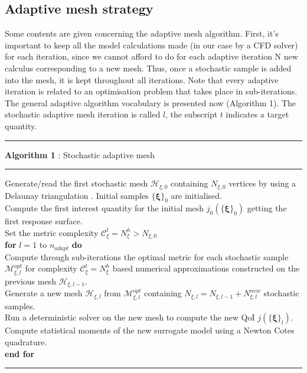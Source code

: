 \documentclass[11pt, a4paper, English]{report}
\begin{document}
\begin{appendix}
\subsection{Adaptive mesh strategy}
Some contents are given concerning the adaptive mesh algorithm. First, it's important to keep all the model calculations made (in our case by a CFD solver) for each iteration, since we cannot afford to do for each adaptive iteration N new calculus corresponding to a new mesh. Thus, once a stochastic sample is added into the mesh, it is kept throughout all iterations. Note that every adaptive iteration is related to an optimisation problem that takes place in sub-iterations. The general adaptive algorithm vocabulary is presented now (Algorithm 1). The stochastic adaptive mesh iteration is called $l$, the subscript $t$ indicates a target quantity.\\
\hrule
\textbf{Algorithm 1} : Stochastic adaptive mesh
\hrule 
\vspace{0.2cm}
Generate/read the first stochastic mesh $\mathcal{H}_{\xi, 0}$ containing $N_{\xi,0}$ vertices by using a Delaunay triangulation \cite{Delaunay}. Initial samples $\{\boldsymbol{\xi}\}_0$ are initialised. \\
Compute the first interest quantity for the initial mesh $j_0(\{\boldsymbol{\xi}\}_0)$ getting the first response surface. \\
Set the metric complexity $\mathcal{C}_\xi^t = N_\xi^h > N_{\xi,0}$\\
\textbf{for} $l = 1$ to $n_{adapt}$ \textbf{do}\\
Compute through sub-iterations the optimal metric for each stochastic sample $\mathcal{M}_{\xi,l}^{opt}$ for complexity $\mathcal{C}_\xi^t = N_\xi^h$ based numerical approximations constructed on the previous mesh $\mathcal{H}_{\xi, l-1}$. \\
Generate a new mesh $\mathcal{H}_{\xi,l}$ from $\mathcal{M}_{\xi,l}^{opt}$ containing $N_{\xi,l} = N_{\xi, l-1} + N_{\xi, l}^{new}$ stochastic samples. \\
Run a deterministic solver on the new mesh to compute the new QoI $j(\{\boldsymbol{\xi}\}_l)$. \\
Compute statistical moments of the new surrogate model using a Newton Cotes quadrature. \\
\textbf{end for}
\vspace{0.2cm}
\hrule

\end{appendix}
\end{document}
